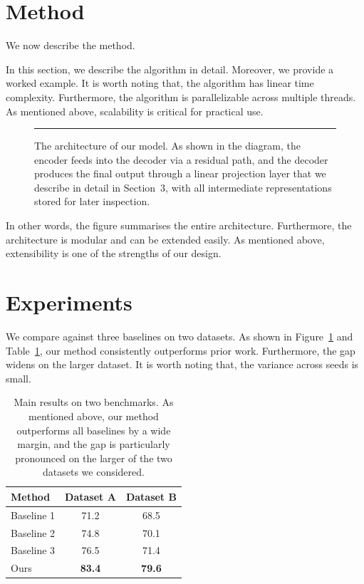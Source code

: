 \documentclass[11pt]{article}
\begin{document}
\section{Method}
We now describe the method. \lipsum[6][1-5]

In this section, we describe the algorithm in detail. Moreover, we provide
a worked example. It is worth noting that, the algorithm has linear time
complexity. Furthermore, the algorithm is parallelizable across multiple
threads. As mentioned above, scalability is critical for practical use.
\lipsum[7][1-4]

\begin{figure}[ht]
  \centering
  \rule{6cm}{3cm}
  \caption{The architecture of our model. As shown in the diagram, the
    encoder feeds into the decoder via a residual path, and the decoder
    produces the final output through a linear projection layer that we
    describe in detail in Section~3, with all intermediate representations
    stored for later inspection.}
  \label{fig:arch}
\end{figure}

In other words, the figure summarises the entire architecture. Furthermore,
the architecture is modular and can be extended easily. As mentioned above,
extensibility is one of the strengths of our design.

\section{Experiments}
We compare against three baselines on two datasets. As shown in
Figure~\ref{fig:arch} and Table~\ref{tab:results}, our method consistently
outperforms prior work. \lipsum[8][1-5] Furthermore, the gap widens on the
larger dataset. It is worth noting that, the variance across seeds is
small.

\begin{table}[ht]
  \centering
  \caption{Main results on two benchmarks. As mentioned above, our method
    outperforms all baselines by a wide margin, and the gap is particularly
    pronounced on the larger of the two datasets we considered.}
  \label{tab:results}
  \begin{tabular}{lcc}
    \toprule
    Method & Dataset A & Dataset B \\
    \midrule
    Baseline 1 & 71.2 & 68.5 \\
    Baseline 2 & 74.8 & 70.1 \\
    Baseline 3 & 76.5 & 71.4 \\
    Ours       & \textbf{83.4} & \textbf{79.6} \\
    \bottomrule
  \end{tabular}
\end{table}
\end{document}
